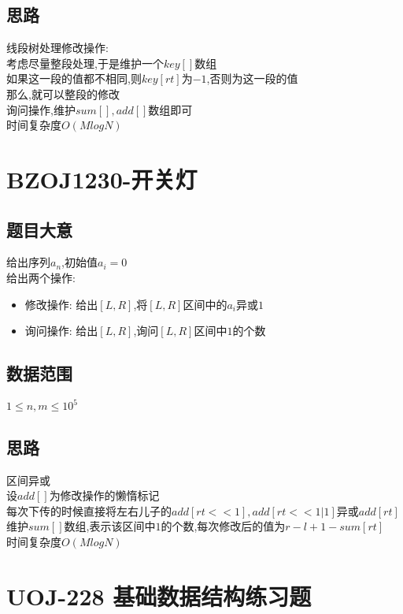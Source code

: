 \documentclass{ctexart}
\numberwithin{equation}{section}
\begin{document}
\begin{flushleft}
  \subsection{思路}
  线段树处理修改操作:\\
  考虑尽量整段处理,于是维护一个$key[]$数组 \\
  如果这一段的值都不相同,则$key[rt]$为$-1$,否则为这一段的值 \\
  那么,就可以整段的修改 \\
  询问操作,维护$sum[],add[]$数组即可 \\
  时间复杂度$O(MlogN)$ \\
  \newpage

  \section{BZOJ1230-开关灯}
  \subsection{题目大意}
  给出序列${a_n}$,初始值$a_i=0$ \\
  给出两个操作: \\
  \begin{itemize}
  \item 修改操作: 给出$[L,R]$,将$[L,R]$区间中的$a_i$异或$1$ \\
  \item 询问操作: 给出$[L,R]$,询问$[L,R]$区间中$1$的个数 \\
  \end{itemize}

  \subsection{数据范围}
  $1\le n,m\le 10^5$ \\
  \subsection{思路}
  区间异或 \\
  设$add[]$为修改操作的懒惰标记\\
  每次下传的时候直接将左右儿子的$add[rt<<1],add[rt<<1|1]$异或$add[rt]$ \\
  维护$sum[]$数组,表示该区间中$1$的个数,每次修改后的值为$r-l+1-sum[rt]$ \\
  时间复杂度$O(MlogN)$ \\
  \newpage

  \section{UOJ-228 基础数据结构练习题}

\end{flushleft}
\end{document}
